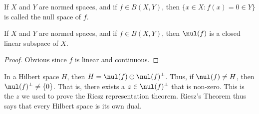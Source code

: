 \documentclass[crop=false,class=article,oneside]{standalone}
\begin{document}
            If $X$ and $Y$ are normed spaces, and if
            $f\in{B(X,Y)}$, then
            $\{x\in{X}:f(x)=0\in{Y}\}$ is called the null
            space of $f$.
            \begin{theorem}
                If $X$ and $Y$ are normed spaces, and if
                $f\in{B(X,Y)}$, then $\nul(f)$ is a closed
                linear subspace of $X$.
            \end{theorem}
            \begin{proof}
                Obvious since $f$ is linear and continuous.
            \end{proof}
            In a Hilbert space $H$, then
            $H=\nul(f)\oplus\nul(f)^{\perp}$. Thus, if
            $\nul(f)\ne{H}$, then $\nul(f)^{\perp}\ne\{0\}$.
            That is, there exists a $z\in\nul(f)^{\perp}$ that
            is non-zero. This is the $z$ we used to prove the
            Riesz representation theorem. Riesz's
            Theorem thus says that every Hilbert space is its own dual.
\end{document}
